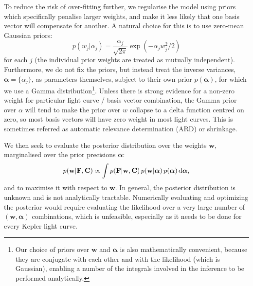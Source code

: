 \documentclass[useAMS,usenatbib]{mn2e}
\begin{document}
To reduce the risk of over-fitting further, we regularise the model using priors
which specifically penalise larger weights, and make it less likely
that one basis vector will compensate for another. A natural choice
for this is to use zero-mean Gaussian priors:
\begin{equation}
p(w_j|\alpha_j) = \frac{\alpha_j}{\sqrt{2 \pi}} \exp\left(-\alpha_j w_j^2 / 2 \right)
\end{equation}
for each $j$ (the individual prior weights are treated as
mutually independent).  Furthermore, we do not fix the priors, but
instead treat the inverse variances, $\boldsymbol{\alpha} = \{\alpha_j\}$, as
parameters themselves, subject to their own prior
$p(\boldsymbol{\alpha})$, for which we use a Gamma
distribution\footnote{Our choice of priors over $\mathbf{w}$ and
  $\boldsymbol{\alpha}$ is also mathematically convenient, because
  they are conjugate with each other and with the likelihood (which is
  Gaussian), enabling a number of the integrals involved in the
  inference to be performed analytically.}. Unless there is strong evidence for a non-zero weight
for particular light curve / basis vector combination, the Gamma prior over
$\alpha$ will tend to make the prior over $w$ collapse to a delta
function centred on zero, so most basis vectors will have zero weight in most
light curves. This is sometimes referred as
automatic relevance determination (ARD) or shrinkage.

We then seek to evaluate the posterior distribution over the weights
$\mathbf{w}$, marginalised over the prior precisions
$\boldsymbol{\alpha}$:
\begin{equation}
p(\mathbf{w}|\mathbf{F},\mathbf{C}) \propto \int
p(\mathbf{F}|\mathbf{w},\mathbf{C})  \, p(\mathbf{w}|\boldsymbol{\alpha}) \, p(\boldsymbol{\alpha}) \, {\rm d}\boldsymbol{\alpha},
\end{equation} 
and to maximise it with respect to $\mathbf{w}$. In general, the
posterior distribution is unknown and is not analytically
tractable. Numerically evaluating and optimizing the posterior would
require evaluating the likelihood over a very large number
of $(\mathbf{w},\boldsymbol{\alpha})$ combinations, which is
unfeasible, especially as it needs to be done for every Kepler
light curve. 
\end{document}

